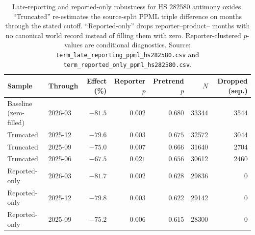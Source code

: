 \begin{table}[H]
\centering
\caption{Late-reporting and reported-only robustness for HS 282580 antimony
oxides. ``Truncated'' re-estimates the source-split PPML triple difference on
months through the stated cutoff. ``Reported-only'' drops reporter--product--
months with no canonical world record instead of filling them with zero.
Reporter-clustered $p$-values are conditional diagnostics. Source:
\texttt{term\_late\_reporting\_ppml\_hs282580.csv} and
\texttt{term\_reported\_only\_ppml\_hs282580.csv}.}
\label{tab:late_reporting}
\footnotesize
\begin{tabular}{llrrrrr}
\toprule
Sample & Through & Effect (\%) & Reporter $p$ & Pretrend $p$ & $N$ & Dropped (sep.) \\
\midrule
Baseline (zero-filled) & 2026-03 & $-81.5$ & $0.002$ & $0.680$ & 33344 & 3544 \\
Truncated              & 2025-12 & $-79.6$ & $0.003$ & $0.675$ & 32572 & 3044 \\
Truncated              & 2025-09 & $-75.0$ & $0.007$ & $0.666$ & 31640 & 2704 \\
Truncated              & 2025-06 & $-67.5$ & $0.021$ & $0.656$ & 30612 & 2460 \\
Reported-only          & 2026-03 & $-81.7$ & $0.002$ & $0.628$ & 29836 & 0 \\
Reported-only          & 2025-12 & $-79.8$ & $0.003$ & $0.622$ & 29142 & 0 \\
Reported-only          & 2025-09 & $-75.2$ & $0.006$ & $0.615$ & 28300 & 0 \\
\bottomrule
\end{tabular}
\end{table}
